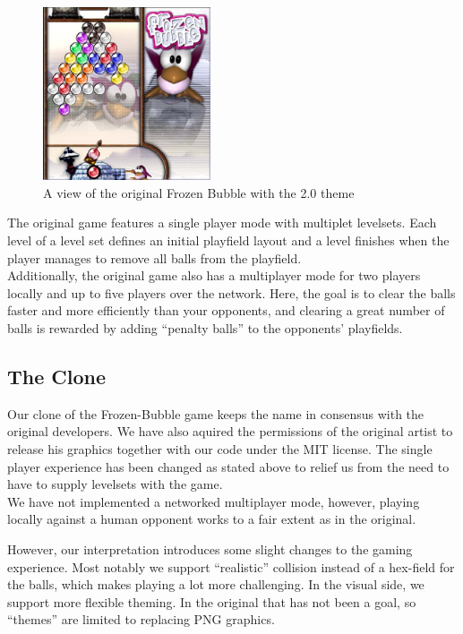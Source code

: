 \begin{figure}
\vspace{-2em}
  \begin{center}
    \includegraphics[width=0.44\textwidth]{images/screenshot1}
  \end{center}
  \vspace{-1em}
  \caption{A view of the original Frozen Bubble with the 2.0 theme}
\vspace{-2em}
\end{figure}

The original game features a single player mode with multiplet levelsets. Each level 
of a level set defines an initial playfield layout and
a level finishes when the player manages to remove all balls 
from the playfield.\\
Additionally, the original game also has a multiplayer mode for two players 
locally and up to five players over the network. Here, the goal is to clear the balls 
faster and more efficiently than your opponents, and clearing a great number of balls 
is rewarded by adding ``penalty balls'' to the opponents' playfields.
%
\subsection{The Clone}
Our clone of the Frozen-Bubble game keeps the name in consensus with the original developers.
We have also aquired the permissions of the original artist to release his graphics 
together with our code under the MIT license.
The single player experience has been changed as stated above to relief us from the need 
to have to supply levelsets with the game.\\
We have not implemented a networked multiplayer mode, however, playing locally against 
a human opponent works to a fair extent as in the original.

However, our interpretation introduces some slight changes to the gaming experience.
Most notably we support ``realistic'' collision instead of a hex-field for the balls, which
makes playing a lot more challenging. In the visual side, we support more flexible theming.
In the original that has not been a goal, so ``themes'' are limited 
to replacing PNG graphics.
%

